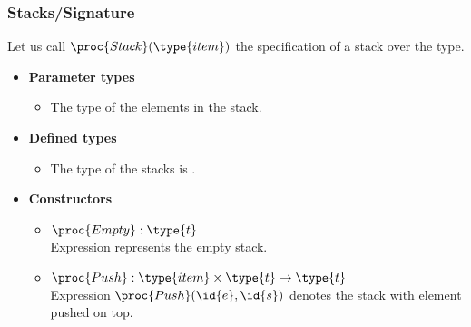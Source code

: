 %
\begin{frame}
\frametitle{Stacks/Signature}

Let us call \(\proc{Stack} (\type{item})\) the specification of
a stack over the  type.
\begin{itemize}

  \item \textbf{Parameter types}

  \begin{itemize}

    \item The type  of the elements in the stack.

  \end{itemize}

  \item \textbf{Defined types}

   \begin{itemize}

     \item The type of the stacks is .

   \end{itemize}

  \item \textbf{Constructors}

  \begin{itemize}

    \item \(\proc{Empty} : \type{t}\)\\
    Expression  represents the empty stack.

    \item \(\proc{Push} : \type{item} \times \type{t}
    \rightarrow \type{t}\)\\
    Expression \(\proc{Push} (\id{e}, \id{s})\) denotes the stack
     with element  pushed on top.

  \end{itemize}

\end{itemize}

\end{frame}

